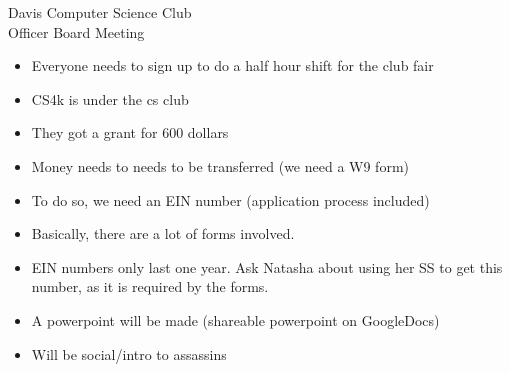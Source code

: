 \documentclass{article}
\begin{document}
\begin{Minutes}{Davis Computer Science Club\\Officer Board Meeting}






\maketitle

\begin{itemize}
    \item Everyone needs to sign up to do a half hour shift for the club fair
\end{itemize}

\begin{itemize}
    \item CS4k is under the cs club
    \item They got a grant for 600 dollars
    	\item Money needs to needs to be transferred (we need a W9 form)
    	\item To do so, we need an EIN number (application process included)
    	\item Basically, there are a lot of forms involved. 
	\item EIN numbers only last one year. Ask Natasha about using her SS to get this number, as it is required by the forms. 
\end{itemize}

\begin{itemize}
    \item A powerpoint will be made (shareable powerpoint on GoogleDocs)
    \item Will be social/intro to assassins
\end{itemize}


\thispagestyle{creditfooter}

\end{Minutes}
\end{document}
